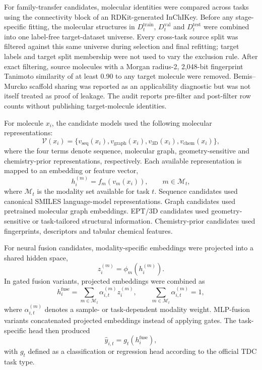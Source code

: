 \documentclass[10pt]{article}
\begin{document}
For family-transfer candidates, molecular identities were compared across tasks using the connectivity block of an RDKit-generated InChIKey. Before any stage-specific fitting, the molecular structures in $D_t^{\mathrm{train}}$, $D_t^{\mathrm{val}}$ and $D_t^{\mathrm{test}}$ were combined into one label-free target-dataset universe. Every cross-task source split was filtered against this same universe during selection and final refitting; target labels and target split membership were not used to vary the exclusion rule. After exact filtering, source molecules with a Morgan radius-2, 2,048-bit fingerprint Tanimoto similarity of at least 0.90 to any target molecule were removed. Bemis--Murcko scaffold sharing was reported as an applicability diagnostic but was not itself treated as proof of leakage. The audit reports pre-filter and post-filter row counts without publishing target-molecule identities.

For molecule $x_i$, the candidate models used the following molecular representations:
\begin{equation}
  \mathcal{V}(x_i)=
  \{v_{\mathrm{seq}}(x_i), v_{\mathrm{graph}}(x_i), v_{\mathrm{3D}}(x_i), v_{\mathrm{chem}}(x_i)\},
\end{equation}
where the four terms denote sequence, molecular graph, geometry-sensitive and chemistry-prior representations, respectively. Each available representation is mapped to an embedding or feature vector,
\begin{equation}
  h_i^{(m)} = f_m\!\left(v_m(x_i)\right), \qquad m \in \mathcal{M}_t,
\end{equation}
where $\mathcal{M}_t$ is the modality set available for task $t$. Sequence candidates used canonical SMILES language-model representations. Graph candidates used pretrained molecular graph embeddings. EPT/3D candidates used geometry-sensitive or task-tailored structural information. Chemistry-prior candidates used fingerprints, descriptors and tabular chemical features.

For neural fusion candidates, modality-specific embeddings were projected into a shared hidden space,
\begin{equation}
  z_i^{(m)} = \phi_m\!\left(h_i^{(m)}\right).
\end{equation}
In gated fusion variants, projected embeddings were combined as
\begin{equation}
  h_i^{\mathrm{fuse}} =
  \sum_{m \in \mathcal{M}_t}\alpha_{i,t}^{(m)} z_i^{(m)},
  \qquad
  \sum_{m \in \mathcal{M}_t}\alpha_{i,t}^{(m)}=1,
\end{equation}
where $\alpha_{i,t}^{(m)}$ denotes a sample- or task-dependent modality weight. MLP-fusion variants concatenated projected embeddings instead of applying gates. The task-specific head then produced
\begin{equation}
  \hat{y}_{i,t}=g_t\!\left(h_i^{\mathrm{fuse}}\right),
\end{equation}
with $g_t$ defined as a classification or regression head according to the official TDC task type.
\end{document}

